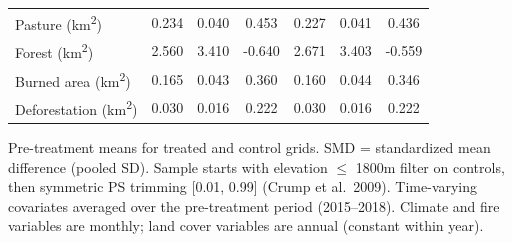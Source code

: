 \begin{table}[!h]
{\begin{threeparttable}
\begin{tabular}[t]{lcccccc}
Pasture (km\textsuperscript{2}) & 0.234 & 0.040 & 0.453 & 0.227 & 0.041 & 0.436\\
Forest (km\textsuperscript{2}) & 2.560 & 3.410 & -0.640 & 2.671 & 3.403 & -0.559\\
Burned area (km\textsuperscript{2}) & 0.165 & 0.043 & 0.360 & 0.160 & 0.044 & 0.346\\
\addlinespace
Deforestation (km\textsuperscript{2}) & 0.030 & 0.016 & 0.222 & 0.030 & 0.016 & 0.222\\
\bottomrule
\end{tabular}
\begin{tablenotes}
\item Pre-treatment means for treated and control grids. SMD = standardized mean difference (pooled SD). Sample starts with elevation $\leq$ 1800m filter on controls, then symmetric PS trimming [0.01, 0.99] (Crump et al.\ 2009). Time-varying covariates averaged over the pre-treatment period (2015--2018). Climate and fire variables are monthly; land cover variables are annual (constant within year).
\end{tablenotes}
\end{threeparttable}}
\end{table}
